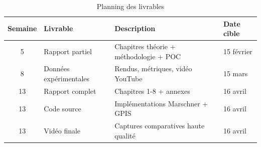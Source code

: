 \documentclass[12pt,a4paper,french]{article}
\begin{document}
\begin{table}[h]
\centering
\small
\begin{tabular}{@{}clp{6cm}l@{}}
\toprule
\textbf{Semaine} & \textbf{Livrable} & \textbf{Description} & \textbf{Date cible} \\ \midrule
5 & Rapport partiel & Chapitres théorie + méthodologie + POC & 15 février \\
8 & Données expérimentales & Rendus, métriques, vidéo YouTube & 15 mars \\
13 & Rapport complet & Chapitres 1-8 + annexes & 16 avril \\
13 & Code source & Implémentations Marschner + GPIS & 16 avril \\
13 & Vidéo finale & Captures comparatives haute qualité & 16 avril \\ \bottomrule
\end{tabular}
\caption{Planning des livrables}
\end{table}

\clearpage


\end{document}
